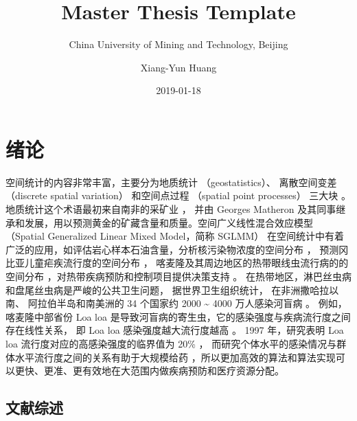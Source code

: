 \documentclass[12pt,a4paper,UTF8,twoside]{book}
\title{Master Thesis Template}
\subtitle{China University of Mining and Technology, Beijing}
\author{Xiang-Yun Huang}
\date{2019-01-18}
\theoremstyle{definition}
\theoremstyle{definition}
\theoremstyle{definition}
\theoremstyle{remark}
\begin{document}





{
\setcounter{tocdepth}{2}
\tableofcontents
}

\mainmatter

\hypertarget{intro}{%
\chapter{绪论}\label{intro}}

空间统计的内容非常丰富，主要分为地质统计 （geostatistics）、 离散空间变差 （discrete spatial variation） 和空间点过程 （spatial point processes） 三大块 \citep{Cressie1993}。 地质统计这个术语最初来自南非的采矿业 \citep{Krige1951}， 并由 Georges Matheron 及其同事继承和发展，用以预测黄金的矿藏含量和质量。空间广义线性混合效应模型 （Spatial Generalized Linear Mixed Model，简称 SGLMM） 在空间统计中有着广泛的应用，如评估岩心样本石油含量，分析核污染物浓度的空间分布 \citep{Diggle1998}， 预测冈比亚儿童疟疾流行度的空间分布 \citep{Diggle2002Childhood}， 喀麦隆及其周边地区的热带眼线虫流行病的的空间分布 \citep{Diggle2007ATMP}，对热带疾病预防和控制项目提供决策支持 \citep{Schl2016Using}。 在热带地区，淋巴丝虫病和盘尾丝虫病是严峻的公共卫生问题， 据世界卫生组织统计， 在非洲撒哈拉以南、 阿拉伯半岛和南美洲的 34 个国家约 2000 \textasciitilde{} 4000 万人感染河盲病 \citep{Takougang2002Rapid}。 例如， 喀麦隆中部省份 Loa loa 是导致河盲病的寄生虫，它的感染强度与疾病流行度之间存在线性关系， 即 Loa loa 感染强度越大流行度越高 \citep{Boussinesq2001}。 1997 年，研究表明 Loa loa 流行度对应的高感染强度的临界值为 20\% \citep{Gardon1997Serious}， 而研究个体水平的感染情况与群体水平流行度之间的关系有助于大规模给药 \citep{Schl2016Using}，所以更加高效的算法和算法实现可以更快、更准、更有效地在大范围内做疾病预防和医疗资源分配。

\hypertarget{reviews}{%
\section{文献综述}\label{reviews}}
\end{document}
